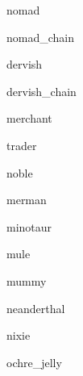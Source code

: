 \documentclass[letterpaper,serif]{module}
\begin{document}
\begin{newmonster}{nomad}\end{newmonster}

\begin{newmonster}{nomad_chain}\end{newmonster}

\begin{newmonster}{dervish}\end{newmonster}

\begin{newmonster}{dervish_chain}\end{newmonster}

\begin{newmonster}{merchant}\end{newmonster}

\begin{newmonster}{trader}\end{newmonster}

\begin{newmonster}{noble}\end{newmonster}

\begin{newmonster}{merman}\end{newmonster}

\begin{newmonster}{minotaur}\end{newmonster}

\begin{newmonster}{mule}\end{newmonster}

\begin{newmonster}{mummy}\end{newmonster}

\begin{newmonster}{neanderthal}\end{newmonster}

\begin{newmonster}{nixie}\end{newmonster}

\begin{newmonster}{ochre_jelly}\end{newmonster}
\end{document}
